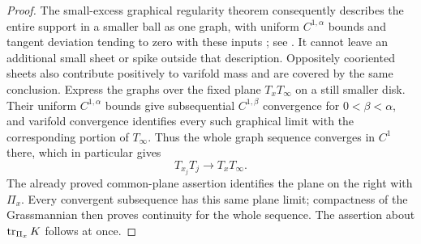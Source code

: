 \begin{proof}
The small-excess graphical regularity theorem consequently describes
the entire support in a smaller ball as one graph, with uniform
$C^{1,\alpha}$ bounds and tangent deviation tending to zero with
these inputs \cite{Allard1972,Maggi2012}; see \cite[Chapter~5, \S5, Theorem~5.2, p.~121]{Simon2014}. It cannot leave an additional
small sheet or spike outside that description. Oppositely cooriented
sheets also contribute positively to varifold mass and are covered
by the same conclusion. Express the graphs over the fixed plane
$T_xT_\infty$ on a still smaller disk. Their uniform $C^{1,\alpha}$
bounds give subsequential $C^{1,\beta}$ convergence for
$0<\beta<\alpha$, and varifold convergence identifies every such
graphical limit with the corresponding portion of $T_\infty$.
Thus the whole graph sequence converges in $C^1$ there, which in
particular gives
\[
 T_{x_j}T_j\longrightarrow T_xT_\infty.
\]
The already proved common-plane assertion identifies the plane on the
right with $\Pi_x$. Every convergent subsequence has this same plane
limit; compactness of the Grassmannian then proves continuity for the
whole sequence. The assertion about $\operatorname{tr}_{\Pi_x}K$ follows at once.
\end{proof}
